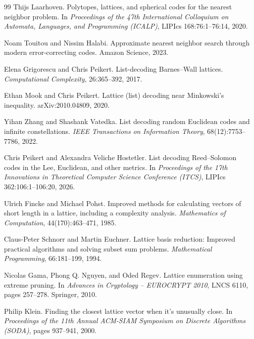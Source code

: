 \documentclass[10pt]{article}
\theoremstyle{definition}
\begin{document}
\begin{thebibliography}{99}
   Thijs Laarhoven.
   \newblock Polytopes, lattices, and spherical codes for the nearest neighbor problem.
   \newblock In \emph{Proceedings of the 47th International Colloquium on Automata, Languages, and Programming (ICALP)}, LIPIcs 168:76:1--76:14, 2020.

   Noam Touitou and Nissim Halabi.
   \newblock Approximate nearest neighbor search through modern error-correcting codes.
   \newblock Amazon Science, 2023.

   Elena Grigorescu and Chris Peikert.
   \newblock List-decoding Barnes--Wall lattices.
   \newblock \emph{Computational Complexity}, 26:365--392, 2017.

   Ethan Mook and Chris Peikert.
   \newblock Lattice (list) decoding near Minkowski's inequality.
   \newblock arXiv:2010.04809, 2020.

   Yihan Zhang and Shashank Vatedka.
   \newblock List decoding random Euclidean codes and infinite constellations.
   \newblock \emph{IEEE Transactions on Information Theory}, 68(12):7753--7786,
   2022.

   Chris Peikert and Alexandra Veliche Hostetler.
   \newblock List decoding Reed--Solomon codes in the Lee, Euclidean, and other
   metrics.
   \newblock In \emph{Proceedings of the 17th Innovations in Theoretical
   Computer Science Conference (ITCS)}, LIPIcs 362:106:1--106:20, 2026.

   Ulrich Fincke and Michael Pohst.
   \newblock Improved methods for calculating vectors of short length in a
   lattice, including a complexity analysis.
   \newblock \emph{Mathematics of Computation}, 44(170):463--471, 1985.

   Claus-Peter Schnorr and Martin Euchner.
   \newblock Lattice basis reduction: Improved practical algorithms and solving
   subset sum problems.
   \newblock \emph{Mathematical Programming}, 66:181--199, 1994.

   Nicolas Gama, Phong Q. Nguyen, and Oded Regev.
   \newblock Lattice enumeration using extreme pruning.
   \newblock In \emph{Advances in Cryptology -- EUROCRYPT 2010}, LNCS 6110,
   pages 257--278. Springer, 2010.

   Philip Klein.
   \newblock Finding the closest lattice vector when it's unusually close.
   \newblock In \emph{Proceedings of the 11th Annual ACM-SIAM Symposium on
   Discrete Algorithms (SODA)}, pages 937--941, 2000.


\end{thebibliography}
\end{document}
